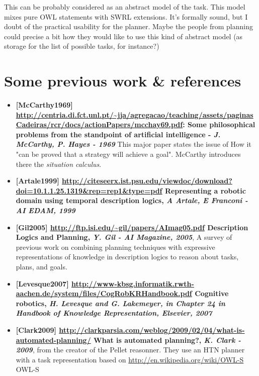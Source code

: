 This can be probably considered as an abstract model of the task. This model
mixes pure OWL statements with SWRL extensions. It's formally sound, but I
doubt of the practical usability for the planner. Maybe the people from
planning could precise a bit how they would like to use this kind of abstract
model (as storage for the list of possible tasks, for instance?)


\section{Some previous work \& references}


\begin{itemize}

\item  {\bf [McCarthy1969]
\url{http://centria.di.fct.unl.pt/~jja/agregacao/teaching/assets/paginasCadeiras/rcr/docs/actionPapers/mcchay69.pdf}:
Some philosophical problems from the standpoint of artificial intelligence -
\emph{J. McCarthy, P. Hayes - 1969}} This major paper states the issue of How
it "can be proved that a strategy will achieve a goal". McCarthy introduces
there the \emph{situation calculus}.

\item  {\bf [Artale1999]
\url{http://citeseerx.ist.psu.edu/viewdoc/download?doi=10.1.1.25.1319&rep=rep1&type=pdf}
Representing a robotic domain using temporal description logics, \emph{A
Artale, E Franconi - AI EDAM, 1999}}

\item  {\bf [Gil2005]
\url{http://ftp.isi.edu/~gil/papers/AImag05.pdf} Description Logics and
Planning, \emph{Y. Gil - AI Magazine, 2005}}, A survey of previous work on
combining planning techniques with expressive representations of knowledge in
description logics to reason about tasks, plans, and goals.

\item  {\bf [Levesque2007]
\url{http://www-kbsg.informatik.rwth-aachen.de/system/files/CogRobKRHandbook.pdf}
Cognitive robotics, \emph{ H. Levesque and G. Lakemeyer, in Chapter 24 in
Handbook of Knowledge Representation, Elsevier, 2007 }}

\item  {\bf [Clark2009]
\url{http://clarkparsia.com/weblog/2009/02/04/what-is-automated-planning/} 
What is automated planning?, \emph{K. Clark - 2009}}, from the creator of the
Pellet reasonner. They use an HTN planner with a task representation based on
\url{http://en.wikipedia.org/wiki/OWL-S} OWL-S

\end{itemize}

